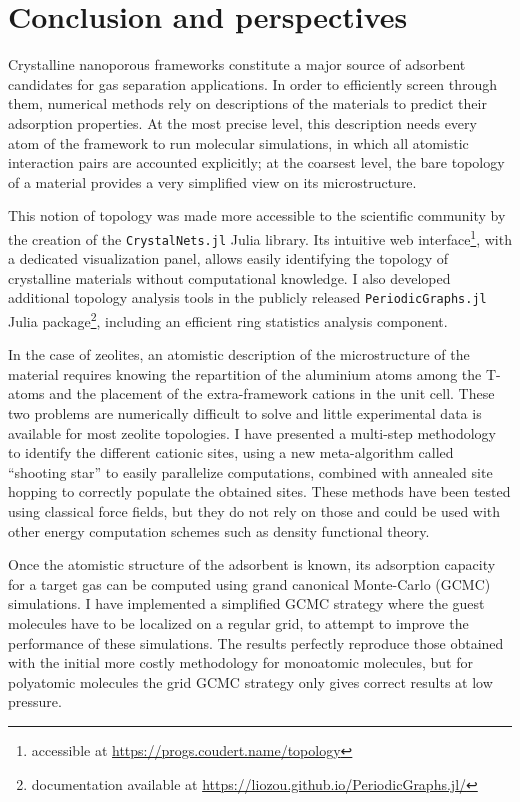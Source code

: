 
\chapter*{Conclusion and perspectives}

Crystalline nanoporous frameworks constitute a major source of adsorbent candidates for gas separation applications. In order to efficiently screen through them, numerical methods rely on descriptions of the materials to predict their adsorption properties. At the most precise level, this description needs every atom of the framework to run molecular simulations, in which all atomistic interaction pairs are accounted explicitly; at the coarsest level, the bare topology of a material provides a very simplified view on its microstructure.

This notion of topology was made more accessible to the scientific community by the creation of the \texttt{CrystalNets.jl} Julia library. Its intuitive web interface\footnote{accessible at \url{https://progs.coudert.name/topology}}, with a dedicated visualization panel, allows easily identifying the topology of crystalline materials without computational knowledge. I also developed additional topology analysis tools in the publicly released \texttt{PeriodicGraphs.jl} Julia package\footnote{documentation available at \url{https://liozou.github.io/PeriodicGraphs.jl/}}, including an efficient ring statistics analysis component.

In the case of zeolites, an atomistic description of the microstructure of the material requires knowing the repartition of the aluminium atoms among the T-atoms and the placement of the extra-framework cations in the unit cell. These two problems are numerically difficult to solve and little experimental data is available for most zeolite topologies. I have presented a multi-step methodology to identify the different cationic sites, using a new meta-algorithm called ``shooting star'' to easily parallelize computations, combined with annealed site hopping to correctly populate the obtained sites. These methods have been tested using classical force fields, but they do not rely on those and could be used with other energy computation schemes such as density functional theory.

Once the atomistic structure of the adsorbent is known, its adsorption capacity for a target gas can be computed using grand canonical Monte-Carlo (GCMC) simulations. I have implemented a simplified GCMC strategy where the guest molecules have to be localized on a regular grid, to attempt to improve the performance of these simulations. The results perfectly reproduce those obtained with the initial more costly methodology for monoatomic molecules, but for polyatomic molecules the grid GCMC strategy only gives correct results at low pressure.

